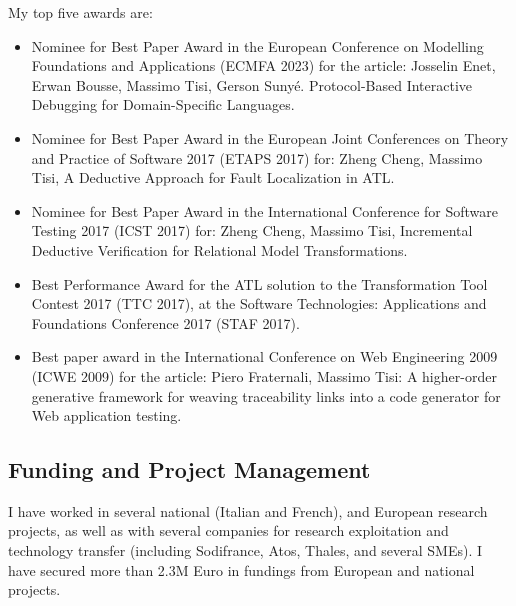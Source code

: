 \medskip
My top five awards are: 
\begin{itemize}
\item Nominee for Best Paper Award in the European Conference on Modelling Foundations and Applications (ECMFA 2023) for the article: Josselin Enet, Erwan Bousse, Massimo Tisi, Gerson Sunyé. Protocol-Based Interactive Debugging for Domain-Specific Languages.
\item Nominee for Best Paper Award in the European Joint Conferences on Theory and Practice of Software 2017 (ETAPS 2017) for: Zheng Cheng, Massimo Tisi, A Deductive Approach for Fault Localization in ATL.
\item Nominee for Best Paper Award in the International Conference for Software Testing 2017 (ICST 2017) for: Zheng Cheng, Massimo Tisi, Incremental Deductive Verification for Relational Model Transformations.
\item Best Performance Award for the ATL solution to the Transformation Tool Contest 2017 (TTC 2017), at the Software Technologies: Applications and Foundations Conference 2017 (STAF 2017).
\item Best paper award in the International Conference on Web Engineering 2009 (ICWE 2009) for the article: Piero Fraternali, Massimo Tisi: A higher-order generative framework for weaving traceability links into a code generator for Web application testing.
\end{itemize}

\subsection*{Funding and Project Management}
I have worked in several national (Italian and French), and European research projects, as well as with several companies for research exploitation and technology transfer (including Sodifrance, Atos, Thales, and several SMEs). I have secured more than 2.3M Euro in fundings from European and national projects.

